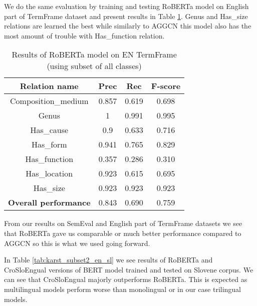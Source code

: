 \documentclass[fleqn,moreauthors,10pt]{ds_report}
\begin{document}

\par We do the same evaluation by training and testing RoBERTa model on English part of TermFrame dataset and present results in Table \ref{tab:karst_subset_bert}. Genus and Has\_size relations are learned the best while similarly to AGGCN this model also has the most amount of trouble with Has\_function relation.

\begin{table}[!ht]
    \centering
    \begin{tabular}{|c|c|c|c|}
        \hline
        \textbf{Relation name} & \textbf{Prec} & \textbf{Rec} & \textbf{F-score} \\ \hline \hline
        Composition\_medium  &  0.857  &  0.619  &  0.698 \\ \hline
        Genus               &  1  &  0.991  &  0.995 \\ \hline
        Has\_cause           &  0.9  &  0.633  &  0.716 \\ \hline
        Has\_form           &  0.941  &  0.765  &  0.829 \\ \hline
        Has\_function        & 0.357  &   0.286  &  0.310 \\ \hline
        Has\_location        &  0.923  &  0.615  &  0.695 \\ \hline
        Has\_size            & 0.923 &  0.923  &  0.923 \\ \hline \hline
        \textbf{Overall performance} & 0.843 & 0.690 & 0.759 \\ \hline
    \end{tabular}
    \caption{Results of RoBERTa model on EN TermFrame (using subset of all classes)}
    \label{tab:karst_subset_bert}
\end{table}



\par From our results on SemEval and English part of TermFrame datasets we see that RoBERTa gave us comparable or much better performance compared to AGGCN so this is what we used going forward. 
\par In Table \ref{tab:karst_subset2_en_sl} we see results of RoBERTa and CroSloEngual versions of BERT model trained and tested on Slovene corpus. We can see that CroSloEngual majorly outperforms RoBERTa. This is expected as multilingual models perform worse than monolingual or in our case trilingual models. 
\end{document}
